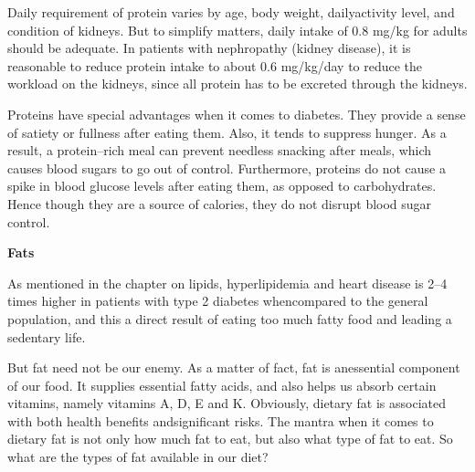 Daily requirement of protein varies by age, body weight, daily\break activity level, and condition of kidneys. But to simplify matters, daily intake of 0.8 mg/kg for adults should be adequate. In patients with nephropathy (kidney disease), it is reasonable to reduce protein intake to about 0.6 mg/kg/day to reduce the workload on the kidneys, since all protein has to be excreted through the kidneys.

Proteins have special advantages when it comes to diabetes. They provide a sense of satiety or fullness after eating them. Also, it tends to suppress hunger. As a result, a protein–rich meal can prevent needless snacking after meals, which causes blood sugars to go out of control. Furthermore, proteins do not cause a spike in blood glucose levels after eating them, as opposed to carbohydrates. Hence though they are a source of calories, they do not disrupt blood sugar control.

\noindent\textbf{Fats}

As mentioned in the chapter on lipids, hyperlipidemia and heart disease is 2–4 times higher in patients with type 2 diabetes when\break compared to the general population, and this a direct result of eating too much fatty food and leading a sedentary life.

But fat need not be our enemy. As a matter of fact, fat is an\break essential component of our food. It supplies essential fatty acids, and also helps us absorb certain vitamins, namely vitamins A, D, E and K. Obviously, dietary fat is associated with both health benefits and\break significant risks. The mantra when it comes to dietary fat is not only how much fat to eat, but also what type of fat to eat. So what are the types of fat available in our diet?

